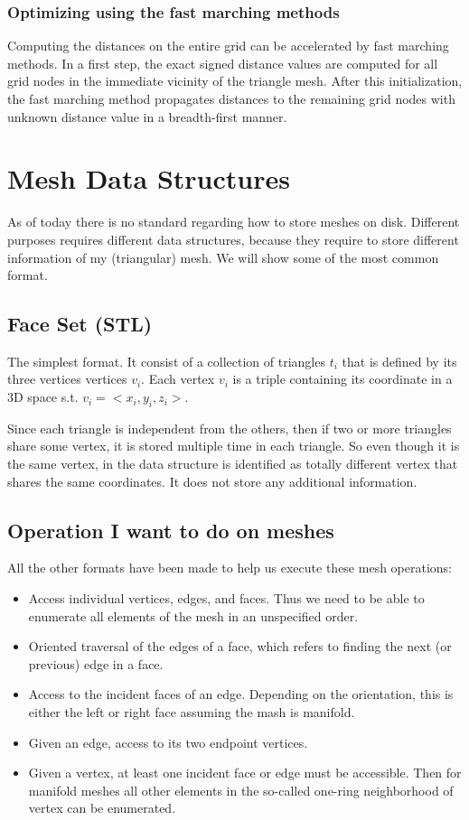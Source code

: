 \subsubsection{Optimizing using the fast marching methods}
Computing the distances on the entire grid can be accelerated by fast marching methods. In a first step, the exact signed distance values are computed for all grid nodes in the immediate vicinity of the triangle mesh. After this initialization, the fast marching method propagates distances to the remaining grid nodes with unknown distance value in a breadth-first manner.

\section{Mesh Data Structures}
As of today there is no standard regarding how to store meshes on disk. Different purposes requires different data structures, because they require to store different information of my (triangular) mesh. We will show some of the most common format.

\subsection{Face Set (STL)}
The simplest format. It consist of a collection of triangles $t_i$ that is defined by its three vertices vertices $v_{i}$. Each vertex $v_{i}$ is a triple containing its coordinate in a 3D space s.t. $v_{i} = <x_{i}, y_{i}, z_{i}>$.\par
Since each triangle is independent from the others, then if two or more triangles share some vertex, it is stored multiple time in each triangle. So even though it is the same vertex, in the data structure is identified as totally different vertex that shares the same coordinates. It does not store any additional information. 

\subsection{Operation I want to do on meshes}
All the other formats have been made to help us execute these mesh operations:
\begin{itemize}
    \item Access individual vertices, edges, and faces. Thus we need to be able to enumerate all elements of the mesh in an unspecified order.
    \item Oriented traversal of the edges of a face, which refers to finding the next (or previous) edge in a face.
    \item Access to the incident faces of an edge. Depending on the orientation, this is either the left or right face assuming the mash is manifold.
    \item Given an edge, access to its two endpoint vertices.
    \item Given a vertex, at least one incident face or edge must be accessible. Then for manifold meshes all other elements in the so-called one-ring neighborhood of vertex can be enumerated.
\end{itemize}

